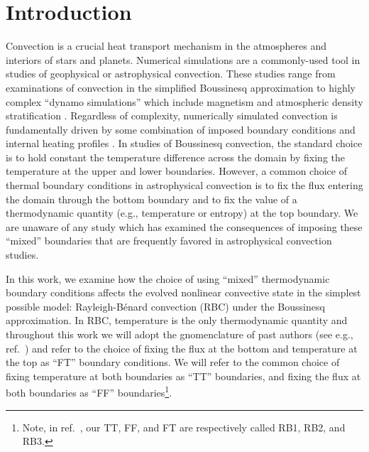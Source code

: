 \documentclass[aps, pre, onecolumn, nofootinbib, notitlepage, groupedaddress, amsfonts, amssymb, amsmath, longbibliography, superscriptaddress]{revtex4-1}
\newcommand{\RB}{Rayleigh-B\'{e}nard }
\begin{document}

\section{Introduction}
\label{sec:introduction}
Convection is a crucial heat transport mechanism in the atmospheres and interiors of stars and planets.
Numerical simulations are a commonly-used tool in studies of geophysical or astrophysical convection.
These studies range from examinations of convection in the simplified Boussinesq approximation \cite{spiegel&veronis1960, ahlers&all2009, plumley&julien2019} to highly complex ``dynamo simulations'' which include magnetism and atmospheric density stratification \cite{charbonneau2014, toomre2019}.
Regardless of complexity, numerically simulated convection is fundamentally driven by some combination of imposed boundary conditions and internal heating profiles \cite{goluskin2016}.
In studies of Boussinesq convection, the standard choice is to hold constant the temperature difference across the domain by fixing the temperature at the upper and lower boundaries.
However, a common choice of thermal boundary conditions in astrophysical convection \cite{glatzmaier&gilman1982, hurlburt&all1986, cattaneo&all1990, featherstone&hindman2016a, korre&all2019, wood&brummell2018, kapyla&all2019, matilsky&all2019} is to fix the flux entering the domain through the bottom boundary and to fix the value of a thermodynamic quantity (e.g., temperature or entropy) at the top boundary.
We are unaware of any study which has examined the consequences of imposing these ``mixed'' boundaries that are frequently favored in astrophysical convection studies.

In this work, we examine how the choice of using ``mixed'' thermodynamic boundary conditions affects the evolved nonlinear convective state in the simplest possible model: \RB convection (RBC) under the Boussinesq approximation.
In RBC, temperature is the only thermodynamic quantity and throughout this work we will adopt the gnomenclature of past authors (see e.g., ref.~\cite{ishiwatari&all1994}) and refer to the choice of fixing the flux at the bottom and temperature at the top as ``FT'' boundary conditions.
We will refer to the common choice of fixing temperature at both boundaries as ``TT'' boundaries, and fixing the flux at both boundaries as ``FF'' boundaries\footnote{Note, in ref.~\cite{goluskin2016}, our TT, FF, and FT are respectively called RB1, RB2, and RB3.}.
\end{document}
